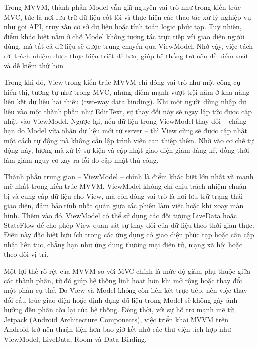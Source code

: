     \begin{flushleft}
      \hspace*{0.8cm}Trong MVVM, thành phần Model vẫn giữ nguyên vai trò như trong kiến trúc MVC, tức là nơi lưu trữ dữ liệu cốt lõi và thực hiện các thao tác xử lý nghiệp vụ như gọi API, truy vấn cơ sở dữ liệu hoặc tính toán logic phức tạp. Tuy nhiên, điểm khác biệt nằm ở chỗ Model không tương tác trực tiếp với giao diện người dùng, mà tất cả dữ liệu sẽ được trung chuyển qua ViewModel. Nhờ vậy, việc tách rời trách nhiệm được thực hiện triệt để hơn, giúp hệ thống trở nên dễ kiểm soát và dễ kiểm thử hơn.
    \end{flushleft}

    \begin{flushleft}
      \hspace*{0.8cm}Trong khi đó, View trong kiến trúc MVVM chỉ đóng vai trò như một công cụ hiển thị, tương tự như trong MVC, nhưng điểm mạnh vượt trội nằm ở khả năng liên kết dữ liệu hai chiều (two-way data binding). Khi một người dùng nhập dữ liệu vào một thành phần như EditText, sự thay đổi này sẽ ngay lập tức được cập nhật vào ViewModel. Ngược lại, nếu dữ liệu trong ViewModel thay đổi – chẳng hạn do Model vừa nhận dữ liệu mới từ server – thì View cũng sẽ được cập nhật một cách tự động mà không cần lập trình viên can thiệp thêm. Nhờ vào cơ chế tự động này, lượng mã xử lý sự kiện và cập nhật giao diện giảm đáng kể, đồng thời làm giảm nguy cơ xảy ra lỗi do cập nhật thủ công.
    \end{flushleft}

    \begin{flushleft}
      \hspace*{0.8cm}Thành phần trung gian – ViewModel – chính là điểm khác biệt lớn nhất và mạnh mẽ nhất trong kiến trúc MVVM. ViewModel không chỉ chịu trách nhiệm chuẩn bị và cung cấp dữ liệu cho View, mà còn đóng vai trò là nơi lưu trữ trạng thái giao diện, đảm bảo tính nhất quán giữa các phiên làm việc hoặc khi xoay màn hình. Thêm vào đó, ViewModel có thể sử dụng các đối tượng LiveData hoặc StateFlow để cho phép View quan sát sự thay đổi của dữ liệu theo thời gian thực. Điều này đặc biệt hữu ích trong các ứng dụng có giao diện phức tạp hoặc cần cập nhật liên tục, chẳng hạn như ứng dụng thương mại điện tử, mạng xã hội hoặc theo dõi vị trí.
    \end{flushleft}

    \begin{flushleft}
      \hspace*{0.8cm}Một lợi thế rõ rệt của MVVM so với MVC chính là mức độ giảm phụ thuộc giữa các thành phần, từ đó giúp hệ thống linh hoạt hơn khi mở rộng hoặc thay đổi một phần cụ thể. Do View và Model không còn liên kết trực tiếp, nên việc thay đổi cấu trúc giao diện hoặc định dạng dữ liệu trong Model sẽ không gây ảnh hưởng đến phần còn lại của hệ thống. Đồng thời, với sự hỗ trợ mạnh mẽ từ Jetpack (Android Architecture Components), việc triển khai MVVM trên Android trở nên thuận tiện hơn bao giờ hết nhờ các thư viện tích hợp như ViewModel, LiveData, Room và Data Binding.
    \end{flushleft}

